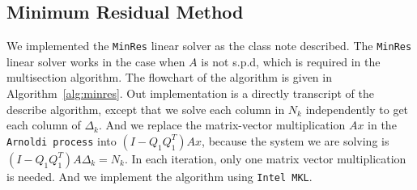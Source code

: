 \subsection{Minimum Residual Method}
We implemented the {\tt MinRes} linear solver as the class note described. The {\tt MinRes} linear solver works in the case when $A$ is not s.p.d, which is required in the multisection algorithm.  The flowchart of the algorithm is given in Algorithm~\ref{alg:minres}. Out implementation is a directly transcript of the describe algorithm, except that we solve each column in $N_k$ independently to get each column of $\Delta_k$. And we replace the matrix-vector multiplication $Ax$ in the {\tt Arnoldi process} into $\left(I-Q_1 Q_1^T\right)Ax$, because the system we are solving is $\left(I-Q_1 Q_1^T\right)A \Delta_k = N_k$. In each iteration, only one matrix vector multiplication is needed. And we implement the algorithm using {\tt Intel MKL}.

